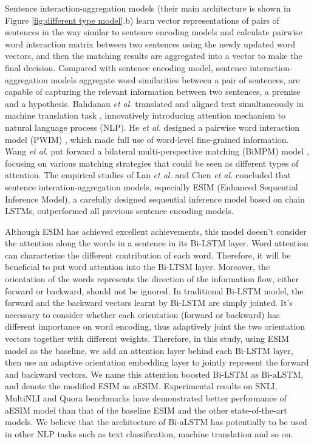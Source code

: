 \documentclass[10pt,sigconf]{acmart}
\begin{document}
Sentence interaction-aggregation models  \cite{parikh2016decomposable,wang2017bilateral,kim2018semantic,lan2018toolkit} (their main architecture is shown in Figure \ref{fig:different type model}.b) learn vector representations of pairs of sentences in the way similar to sentence encoding models and calculate pairwise word interaction matrix between two sentences using the newly updated word vectors, and then the matching results are aggregated into a vector to make the final decision. Compared with sentence encoding model, sentence interaction-aggregation models aggregate word similarities between a pair of sentences, are capable of capturing the relevant information between two sentences, a premise and a hypothesis. Bahdanau {\it et al.}  translated and aligned text simultaneously in machine translation task  \cite{bahdanau2014neural}, innovatively introducing attention mechanism to natural language process (NLP). He {\it et al.} designed a pairwise word interaction model (PWIM)  \cite{he2016pairwise}, which made full use of word-level fine-grained information. Wang {\it et al.} put forward a bilateral multi-perspective matching (BiMPM) model \cite{wang2017bilateral}, focusing on various matching strategies that could be seen as different types of attention. The empirical studies of Lan {\it et al.} \cite{lan2018toolkit} and Chen {\it et al.} \cite{chen2016enhanced} concluded that sentence interation-aggregation models, especially ESIM (Enhanced Sequential Inference Model), a carefully designed sequential inference model based on chain LSTMs, outperformed all previous sentence encoding models.

Although ESIM has achieved excellent achievements, this model doesn’t consider the attention along the words in a sentence in its Bi-LSTM layer. Word attention can characterize the different contribution of each word. Therefore, it will be beneficial to put word attention into the Bi-LTSM layer. Moreover, the orientation of the words represents the direction of the information flow, either forward or backward, should not be ignored. In traditional Bi-LSTM model, the forward and the backward vectors learnt by Bi-LSTM are simply jointed. It's necessary to consider whether each orientation (forward or backward) has different importance on word encoding, thus adaptively joint the two orientation vectors together with different weights. Therefore, in this study, using ESIM model as the baseline, we add an attention layer behind each Bi-LSTM layer, then use an adaptive orientation embedding layer to jointly represent the forward and backward vectors. We name this attention boosted Bi-LSTM as Bi-aLSTM, and denote the modified ESIM as aESIM. Experimental results on SNLI, MultiNLI \cite{williams2017broad} and  Quora \cite{wang2017bilateral} benchmarks have demonstrated better performance of aESIM model than that of the baseline ESIM and the other state-of-the-art models. We believe that the architecture of Bi-aLSTM has potentially to be used in other NLP tasks such as text classification, machine translation and so on.
\end{document}
